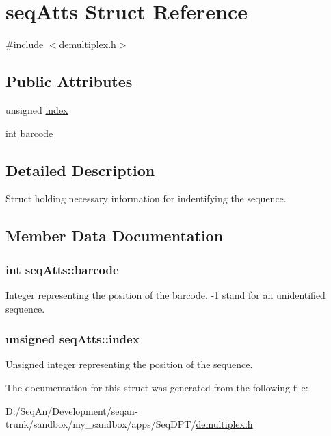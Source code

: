 \hypertarget{structseq_atts}{\section{seq\-Atts Struct Reference}
\label{structseq_atts}
}


{\ttfamily \#include $<$demultiplex.\-h$>$}

\subsection*{Public Attributes}
\begin{DoxyCompactItemize}
\item 
unsigned \hyperlink{structseq_atts_a4bf0d6752195a62b3736b0c3fb8f0d8e}{index}
\item 
int \hyperlink{structseq_atts_a55fccdeeaba739b205cf9a7a9a6aa60d}{barcode}
\end{DoxyCompactItemize}


\subsection{Detailed Description}
Struct holding necessary information for indentifying the sequence. 

\subsection{Member Data Documentation}
\hypertarget{structseq_atts_a55fccdeeaba739b205cf9a7a9a6aa60d}{
\subsubsection[{barcode}]{\setlength{\rightskip}{0pt plus 5cm}int seq\-Atts\-::barcode}}\label{structseq_atts_a55fccdeeaba739b205cf9a7a9a6aa60d}
Integer representing the position of the barcode. -\/1 stand for an unidentified sequence. \hypertarget{structseq_atts_a4bf0d6752195a62b3736b0c3fb8f0d8e}{
\subsubsection[{index}]{\setlength{\rightskip}{0pt plus 5cm}unsigned seq\-Atts\-::index}}\label{structseq_atts_a4bf0d6752195a62b3736b0c3fb8f0d8e}
Unsigned integer representing the position of the sequence. 

The documentation for this struct was generated from the following file\-:\begin{DoxyCompactItemize}
\item 
D\-:/\-Seq\-An/\-Development/seqan-\/trunk/sandbox/my\-\_\-sandbox/apps/\-Seq\-D\-P\-T/\hyperlink{demultiplex_8h}{demultiplex.\-h}\end{DoxyCompactItemize}
